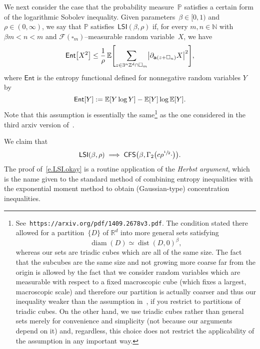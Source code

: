 \documentclass[11pt]{article} %
\let\oldsquare\square %
\renewcommand{\square}{\oldsquare}
\numberwithin{equation}{section}
\theoremstyle{definition}
\let\originalleft\left
\let\originalright\right
\renewcommand{\left}{\mathopen{}\mathclose\bgroup\originalleft}
\renewcommand{\right}{\aftergroup\egroup\originalright}
\newcommand*{\N}{\ensuremath{\mathbb{N}}}
\newcommand*{\Zd}{\ensuremath{\mathbb{Z}^d}}
\newcommand*{\Rd}{\ensuremath{\mathbb{R}^d}}
\renewcommand{\a}{\mathbf{a}}
\newcommand{\cu}{\square}
\newcommand{\F}{\mathcal{F}}
\renewcommand{\P}{\mathbb{P}}
\newcommand{\E}{\mathbb{E}}
\DeclareMathOperator{\dist}{dist}
\DeclareMathOperator{\diam}{diam}
\newcommand{\Ent}{\mathsf{Ent}}
\newcommand{\CFS}{\mathsf{CFS}}
\newcommand{\LSI}{\mathsf{LSI}}
\begin{document}
We next consider the case that the probability measure~$\P$ satisfies a certain form of the logarithmic Sobolev inequality. Given parameters~$\beta\in [0,1)$ and $\rho\in (0,\infty)$, we say that $\P$ satisfies~$\LSI(\beta,\rho)$ if, for every $m,n\in\N$ with $\beta m  < n < m$ and $\F(\cu_m)$--measurable random variable~$X$, we have 
\begin{equation} 
\label{e.LSI.ass}
\Ent\left[  X^2 \right]
\leq 
\frac1\rho\,
\E \Biggl[
\sum_{z\in 3^n\Zd \cap \cu
_m}
\bigl| \partial_{\a(z+\cu_n)} X
\bigr|^2
\Biggr],
\end{equation}
where $\Ent$ is the entropy functional defined for nonnegative random variables $Y$ by 
\begin{equation*} \label{}
\Ent\left[  Y \right]:=
\E \left[  Y\log Y \right]
-\E \left[  Y \right] \log \E \left[  Y \right].
\end{equation*}
Note that this assumption is essentially the same\footnote{See~{\tt https://arxiv.org/pdf/1409.2678v3.pdf}. The condition stated there allowed for a partition~$\{ D \}$  of $\Rd$ into more general sets satisfying
\begin{equation*} \label{}
\diam(D) \simeq \dist(D,0)^{\beta},
\end{equation*}
whereas our sets are triadic cubes which are all of the same size. The fact that the subcubes are the same size and not growing more coarse far from the origin is allowed by the fact that we consider random variables which are measurable with respect to a fixed macroscopic cube (which fixes a largest, macroscopic scale) and therefore our partition is actually coarser and thus our inequality weaker than the assumption in~\cite{GNO2}, if you restrict to partitions of triadic cubes. On the other hand, we use triadic cubes rather than general sets merely for convenience and simplicity (not because our arguments depend on it) and, regardless, this choice does not restrict the applicability of the assumption in any important way.} as the one considered in the third arxiv version of~\cite{GNO2}. 

\smallskip

We claim that 
\begin{equation} 
\label{e.LSI.okay}
\LSI(\beta,\rho) \implies \CFS\bigl(\beta, \Gamma_2\bigl(c \rho^{\sfrac12}  \cdot  \bigr)  \bigr).
\end{equation}
The proof of~\eqref{e.LSI.okay} is a routine application of the \emph{Herbst argument}, which is the name given to the standard method of combining entropy inequalities with the exponential moment method to obtain (Gaussian-type) concentration inequalities. 
\end{document}
